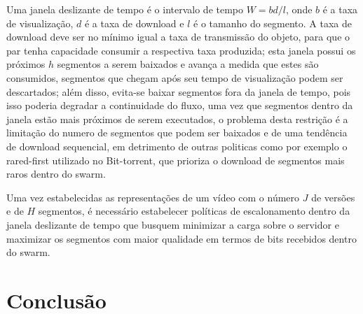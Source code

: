 \documentclass[
	12pt,
	oneside,
	a4paper,
	english,
	brazil
	]{abntex2ppgsi}
\begin{document}
Uma janela deslizante de tempo é o intervalo de tempo $W=bd/l$, onde $b$ é a taxa de visualização, $d$ é a taxa de download e $l$ é o tamanho do segmento. A taxa de download deve ser no mínimo igual a taxa de transmissão do objeto, para que o par tenha capacidade consumir a respectiva taxa produzida; esta janela possui os próximos $h$ segmentos a serem baixados e avança a medida que estes são consumidos, segmentos que chegam após seu tempo de visualização podem ser descartados; além disso, evita-se baixar segmentos fora da janela de tempo, pois isso poderia degradar a continuidade do fluxo, uma vez que segmentos dentro da janela estão mais próximos de serem executados,  o problema desta restrição é a limitação do numero de segmentos que podem ser baixados e de uma tendência de download sequencial, em detrimento de outras politicas como por exemplo o rared-first utilizado no Bit-torrent, que prioriza o download de segmentos mais raros dentro do swarm.

Uma vez estabelecidas as representações de um vídeo com o número $J$ de versões e de $H$ segmentos, é necessário estabelecer políticas de escalonamento dentro da janela deslizante de tempo que busquem minimizar a carga sobre o servidor e maximizar os segmentos com maior qualidade em termos de bits recebidos dentro do swarm.

\chapter{Conclusão}

\postextual
%

\end{document}
